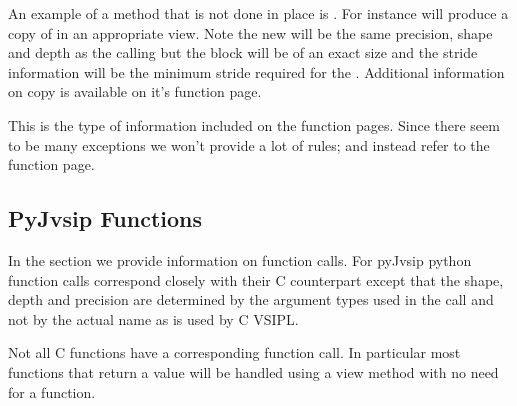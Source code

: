 An example of a  method that is not done in place is . For instance  will produce a copy of  in an appropriate view. Note the new  will be the same precision, shape and depth as the calling  but the \ttbf block will be of an exact size and the stride information will be the minimum stride required for the . Additional information on copy is available on it's function page.

This is the type of information included on the function pages. Since there seem to be many exceptions we won't provide a lot of rules; and instead refer to the function page.

\subsection*{PyJvsip Functions}
In the \pyjv {} section we provide information on function calls. For pyJvsip python function calls correspond closely with their C counterpart except that the shape, depth and precision are determined by the argument types used in the call and not by the actual name as is used by C VSIPL.

Not all C functions have a corresponding \pyjv function call. In particular most functions that return a value will be handled using a view method with no need for a function.
 


















